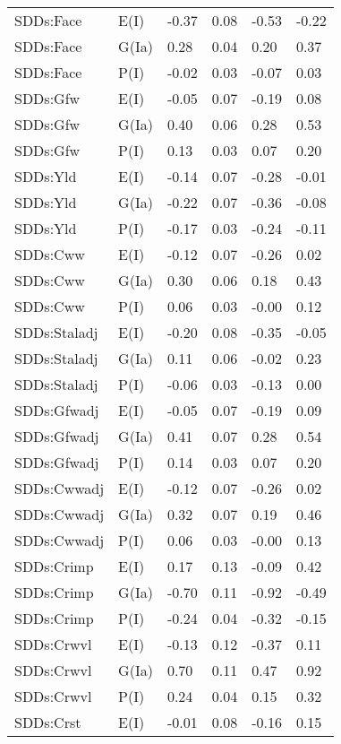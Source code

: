 \begin{center}
\begin{longtable}{|p{1.1in}|p{0.7in}|p{0.7in}|p{0.6in}|p{0.6in}|p{0.6in}|}
  SDDs:Face & E(I) & -0.37 & 0.08 & -0.53 & -0.22 \\ 
  SDDs:Face & G(Ia) & 0.28 & 0.04 & 0.20 & 0.37 \\ 
  SDDs:Face & P(I) & -0.02 & 0.03 & -0.07 & 0.03 \\ 
  SDDs:Gfw & E(I) & -0.05 & 0.07 & -0.19 & 0.08 \\ 
  SDDs:Gfw & G(Ia) & 0.40 & 0.06 & 0.28 & 0.53 \\ 
  SDDs:Gfw & P(I) & 0.13 & 0.03 & 0.07 & 0.20 \\ 
  SDDs:Yld & E(I) & -0.14 & 0.07 & -0.28 & -0.01 \\ 
  SDDs:Yld & G(Ia) & -0.22 & 0.07 & -0.36 & -0.08 \\ 
  SDDs:Yld & P(I) & -0.17 & 0.03 & -0.24 & -0.11 \\ 
  SDDs:Cww & E(I) & -0.12 & 0.07 & -0.26 & 0.02 \\ 
  SDDs:Cww & G(Ia) & 0.30 & 0.06 & 0.18 & 0.43 \\ 
  SDDs:Cww & P(I) & 0.06 & 0.03 & -0.00 & 0.12 \\ 
  SDDs:Staladj & E(I) & -0.20 & 0.08 & -0.35 & -0.05 \\ 
  SDDs:Staladj & G(Ia) & 0.11 & 0.06 & -0.02 & 0.23 \\ 
  SDDs:Staladj & P(I) & -0.06 & 0.03 & -0.13 & 0.00 \\ 
  SDDs:Gfwadj & E(I) & -0.05 & 0.07 & -0.19 & 0.09 \\ 
  SDDs:Gfwadj & G(Ia) & 0.41 & 0.07 & 0.28 & 0.54 \\ 
  SDDs:Gfwadj & P(I) & 0.14 & 0.03 & 0.07 & 0.20 \\ 
  SDDs:Cwwadj & E(I) & -0.12 & 0.07 & -0.26 & 0.02 \\ 
  SDDs:Cwwadj & G(Ia) & 0.32 & 0.07 & 0.19 & 0.46 \\ 
  SDDs:Cwwadj & P(I) & 0.06 & 0.03 & -0.00 & 0.13 \\ 
  SDDs:Crimp & E(I) & 0.17 & 0.13 & -0.09 & 0.42 \\ 
  SDDs:Crimp & G(Ia) & -0.70 & 0.11 & -0.92 & -0.49 \\ 
  SDDs:Crimp & P(I) & -0.24 & 0.04 & -0.32 & -0.15 \\ 
  SDDs:Crwvl & E(I) & -0.13 & 0.12 & -0.37 & 0.11 \\ 
  SDDs:Crwvl & G(Ia) & 0.70 & 0.11 & 0.47 & 0.92 \\ 
  SDDs:Crwvl & P(I) & 0.24 & 0.04 & 0.15 & 0.32 \\ 
  SDDs:Crst & E(I) & -0.01 & 0.08 & -0.16 & 0.15 \\ 

\end{longtable}
\end{center}
